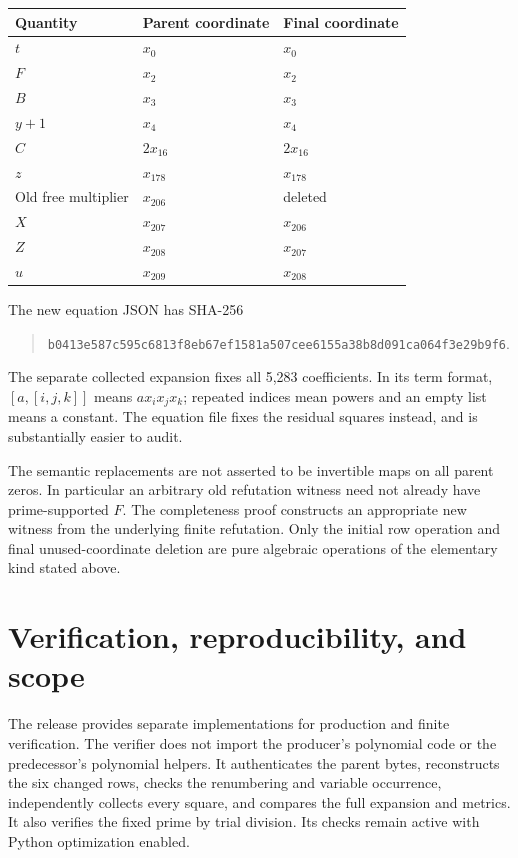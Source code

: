 \documentclass[11pt]{article}
\theoremstyle{definition}
\theoremstyle{remark}
\begin{document}
\begin{center}
\begin{tabular}{lll}
\toprule
Quantity & Parent coordinate & Final coordinate\\
\midrule
$t$ & $x_0$ & $x_0$\\
$F$ & $x_2$ & $x_2$\\
$B$ & $x_3$ & $x_3$\\
$y+1$ & $x_4$ & $x_4$\\
$C$ & $2x_{16}$ & $2x_{16}$\\
$z$ & $x_{178}$ & $x_{178}$\\
Old free multiplier & $x_{206}$ & deleted\\
$X$ & $x_{207}$ & $x_{206}$\\
$Z$ & $x_{208}$ & $x_{207}$\\
$u$ & $x_{209}$ & $x_{208}$\\
\bottomrule
\end{tabular}
\end{center}

The new equation JSON has SHA-256
\begin{quote}\small\ttfamily
\nolinkurl{b0413e587c595c6813f8eb67ef1581a507cee6155a38b8d091ca064f3e29b9f6}.
\end{quote}
The separate collected expansion fixes all 5,283 coefficients. In its
term format, $[a,[i,j,k]]$ means $a x_ix_jx_k$; repeated indices mean
powers and an empty list means a constant. The equation file fixes the
residual squares instead, and is substantially easier to audit.

The semantic replacements are not asserted to be invertible maps on all
parent zeros. In particular an arbitrary old refutation witness need not
already have prime-supported $F$. The completeness proof constructs an
appropriate new witness from the underlying finite refutation.
Only the initial row operation and final unused-coordinate deletion are
pure algebraic operations of the elementary kind stated above.

\section{Verification, reproducibility, and scope}\label{sec:verify}

The release provides separate implementations for production and finite
verification. The verifier does not import the producer's polynomial code
or the predecessor's polynomial helpers. It authenticates the parent
bytes, reconstructs the six changed rows, checks the renumbering and
variable occurrence, independently collects every square, and compares
the full expansion and metrics. It also verifies the fixed prime by trial
division. Its checks remain active with Python optimization enabled.
\end{document}
